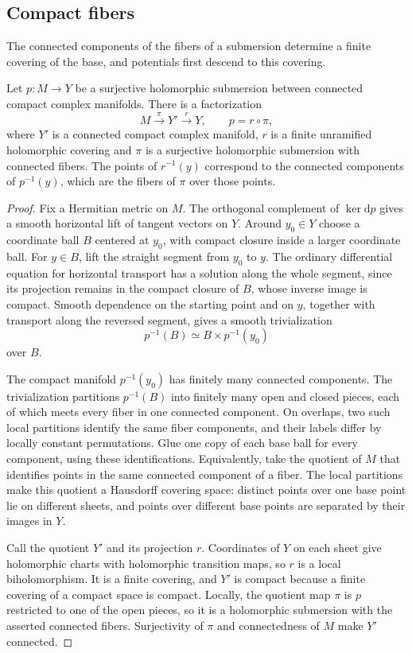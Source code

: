 \subsection{Compact fibers}

The connected components of the fibers of a submersion determine a finite covering of the base, and potentials first descend to this covering.

\begin{lemma}\label{lem:submersion-component-cover}
Let $p\colon M\to Y$ be a surjective holomorphic submersion between connected compact complex manifolds. There is a factorization
\[
 M\xrightarrow{\pi}Y'\xrightarrow{r}Y,\qquad p=r\circ\pi,
\]
where $Y'$ is a connected compact complex manifold, $r$ is a finite unramified holomorphic covering and $\pi$ is a surjective holomorphic submersion with connected fibers. The points of $r^{-1}(y)$ correspond to the connected components of $p^{-1}(y)$, which are the fibers of $\pi$ over those points.
\end{lemma}
\begin{proof}
Fix a Hermitian metric on $M$. The orthogonal complement of $\ker\mathrm dp$ gives a smooth horizontal lift of tangent vectors on $Y$. Around $y_0\in Y$ choose a coordinate ball $B$ centered at $y_0$, with compact closure inside a larger coordinate ball. For $y\in B$, lift the straight segment from $y_0$ to $y$. The ordinary differential equation for horizontal transport has a solution along the whole segment, since its projection remains in the compact closure of $B$, whose inverse image is compact. Smooth dependence on the starting point and on $y$, together with transport along the reversed segment, gives a smooth trivialization
\[
 p^{-1}(B)\simeq B\times p^{-1}(y_0)
\]
over $B$.

The compact manifold $p^{-1}(y_0)$ has finitely many connected components. The trivialization partitions $p^{-1}(B)$ into finitely many open and closed pieces, each of which meets every fiber in one connected component. On overlaps, two such local partitions identify the same fiber components, and their labels differ by locally constant permutations. Glue one copy of each base ball for every component, using these identifications. Equivalently, take the quotient of $M$ that identifies points in the same connected component of a fiber. The local partitions make this quotient a Hausdorff covering space: distinct points over one base point lie on different sheets, and points over different base points are separated by their images in $Y$.

Call the quotient $Y'$ and its projection $r$. Coordinates of $Y$ on each sheet give holomorphic charts with holomorphic transition maps, so $r$ is a local biholomorphism. It is a finite covering, and $Y'$ is compact because a finite covering of a compact space is compact. Locally, the quotient map $\pi$ is $p$ restricted to one of the open pieces, so it is a holomorphic submersion with the asserted connected fibers. Surjectivity of $\pi$ and connectedness of $M$ make $Y'$ connected.
\end{proof}

